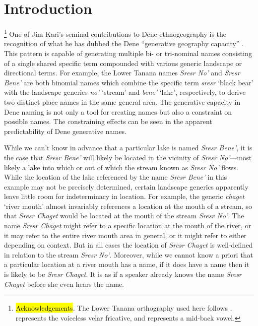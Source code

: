 \section{Introduction}\hspace{-0.3cm}\footnote{\hl{Acknowledgements}. The Lower Tanana orthography used here follows \citet{kari2012}.  represents the voiceless velar fricative, and  represents a mid-back vowel.}
One of Jim Kari’s seminal contributions to Dene ethnogeography is the recognition of what he has dubbed the Dene “generative geography capacity” \citep{kari2010}. This pattern is capable of generating multiple bi- or tri-nominal names consisting of a single shared specific term compounded with various generic landscape or directional terms. For example, the Lower Tanana names \textit{Sresr No’} and \textit{Sresr Bene’} are both binomial names which combine the specific term \textit{sresr} ‘black bear’ with the landscape generics \textit{no’} `stream’ and \textit{bene’}  ‘lake’, respectively, to derive two distinct place names in the same general area. The generative capacity in Dene naming is not only a tool for creating names but also a constraint on possible names. The constraining effects can be seen in the apparent predictability of Dene generative names.

While we can’t know in advance that a particular lake is named \textit{Sresr Bene’}, it is the case that \textit{Sresr Bene’} will likely be located in the vicinity of \textit{Sresr No’}---most likely a lake into which or out of which the stream known as \textit{Sresr No’} flows. While the location of the lake referenced by the name \textit{Sresr Bene’} in this example may not be precisely determined, certain landscape generics apparently leave little room for indeterminacy in location. For example, the generic \textit{chaget} ‘river mouth’ almost invariably references a location at the mouth of a stream, so that \textit{Sresr Chaget} would be located at the mouth of the stream \textit{Sresr No’}. The name \textit{Sresr Chaget} might refer to a specific location at the mouth of the river, or it may refer to the entire river mouth area in general, or it might refer to either depending on context. But in all cases the location of \textit{Sresr Chaget} is well-defined in relation to the stream \textit{Sresr No’}. Moreover, while we cannot know a priori that a particular location at a river mouth has a name, if it does have a name then it is likely to be \textit{Sresr Chaget}. It is as if a speaker already knows the name \textit{Sresr Chaget} before she even hears the name.

